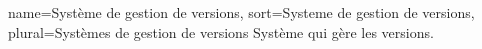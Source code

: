 {
  name=Système de gestion de versions,
  sort=Systeme de gestion de versions,
  plural=Systèmes de gestion de versions
}
{Système qui gère les versions.}